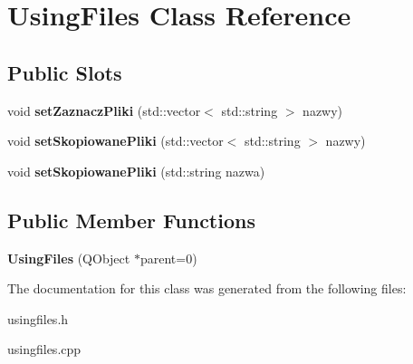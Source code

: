 \hypertarget{class_using_files}{
\section{UsingFiles Class Reference}
\label{class_using_files}
}
\subsection*{Public Slots}
\begin{DoxyCompactItemize}
\item 
\hypertarget{class_using_files_a7b2ba16a167d1b6e848ddad6a92954af}{
void {\bfseries setZaznaczPliki} (std::vector$<$ std::string $>$ nazwy)}
\label{class_using_files_a7b2ba16a167d1b6e848ddad6a92954af}

\item 
\hypertarget{class_using_files_aeaa933db71f88ba2eb4f318bf229f64c}{
void {\bfseries setSkopiowanePliki} (std::vector$<$ std::string $>$ nazwy)}
\label{class_using_files_aeaa933db71f88ba2eb4f318bf229f64c}

\item 
\hypertarget{class_using_files_a9c7dba8d3ee6c87784f1de8e4ff9cf44}{
void {\bfseries setSkopiowanePliki} (std::string nazwa)}
\label{class_using_files_a9c7dba8d3ee6c87784f1de8e4ff9cf44}

\end{DoxyCompactItemize}
\subsection*{Public Member Functions}
\begin{DoxyCompactItemize}
\item 
\hypertarget{class_using_files_ae1a310dd364f0e826d48d1cf60593b9e}{
{\bfseries UsingFiles} (QObject $\ast$parent=0)}
\label{class_using_files_ae1a310dd364f0e826d48d1cf60593b9e}

\end{DoxyCompactItemize}


The documentation for this class was generated from the following files:\begin{DoxyCompactItemize}
\item 
usingfiles.h\item 
usingfiles.cpp\end{DoxyCompactItemize}
